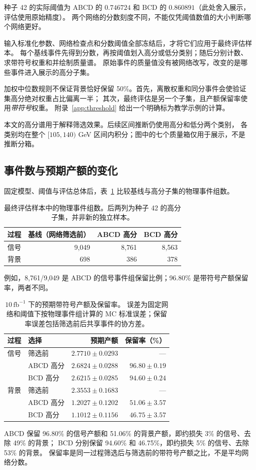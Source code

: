 \documentclass[11pt,a4paper,fontset=fandol,scheme=plain]{ctexart}
\begin{document}
种子 42 的实际阈值为 ABCD 的 $0.746724$ 和 BCD 的 $0.860891$（此处舍入展示，评估使用原始精度）。
两个网络的分数刻度不同，不能仅凭阈值数值的大小判断哪个网络更好。

输入标准化参数、网络检查点和分数阈值全部冻结后，才将它们应用于最终评估样本。
每个基线事件先得到分数，再按阈值划入高分或低分类别；随后分别计数、求带符号权重和并绘制质量谱。
原始事件的质量值没有被网络改写，改变的是哪些事件进入展示的高分子集。

加权中位数规则不保证背景恰好保留 50\%。首先，离散权重和同分事件会使验证集高分绝对权重占比偏离一半；
其次，最终评估是另一个子集，且产额保留率使用\emph{带符号}权重。
附录~\ref{app:threshold} 给出一个明确标为教学示例的计算。

本文的高分谱用于解释筛选效果。后续区间推断仍使用高分和低分两个类别，
各类别均在整个 $[105,140)$ GeV 区间内积分；图中的七个质量箱仅用于展示，不是推断分箱。

\subsection{事件数与预期产额的变化}

固定模型、阈值与评估总体后，表~\ref{tab:groups} 比较基线与高分子集的物理事件组数。
\begin{table}[H]
\caption{最终评估样本中的物理事件组数。后两列为种子 42 的高分子集，并非新的独立样本。}
\label{tab:groups}
\centering
\small
\begin{tabular}{lrrr}
\toprule
过程 & 基线（网络筛选前） & ABCD 高分 & BCD 高分 \\
\midrule
信号 & 9,049 & 8,761 & 8,563 \\
背景 & 698 & 386 & 378 \\
\bottomrule
\end{tabular}
\end{table}
例如，8,761/9,049 是 ABCD 的信号事件组保留比例；96.80\% 是带符号产额保留率，两者不同。
\begin{table}[H]
\caption{$10\,\mathrm{fb}^{-1}$ 下的预期带符号产额及保留率。
误差为固定网络和阈值下按物理事件组计算的 MC 标准误差；保留率误差包括筛选前后共享事件的协方差。}
\label{tab:yields}
\centering
\small
\begin{tabular}{llrr}
\toprule
过程 & 选择 & 预期产额 & 保留率（\%） \\
\midrule
信号 & 筛选前 & $2.7710\pm0.0293$ & --- \\
 & ABCD 高分 & $2.6824\pm0.0288$ & $96.80\pm0.19$ \\
 & BCD 高分 & $2.6215\pm0.0285$ & $94.60\pm0.24$ \\
背景 & 筛选前 & $2.3553\pm0.1683$ & --- \\
 & ABCD 高分 & $1.2027\pm0.1202$ & $51.06\pm3.57$ \\
 & BCD 高分 & $1.1012\pm0.1156$ & $46.75\pm3.57$ \\
\bottomrule
\end{tabular}
\end{table}
ABCD 保留 96.80\% 的信号产额和 51.06\% 的背景产额，即约损失 3\% 的信号、去除 49\% 的背景；
BCD 分别保留 94.60\% 和 46.75\%，即约损失 5\% 的信号、去除 53\% 的背景。
保留率是同一过程筛选后与筛选前的带符号产额之比，不是平均网络分数。
\end{document}
